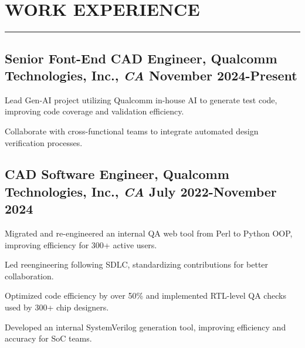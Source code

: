 \documentclass[11pt]{article}
\begin{document}
\vspace{0.1in}

\section*{\MakeUppercase{Work Experience}}
\hrule
\medskip
\subsection*{Senior Font-End CAD Engineer{\normalfont, Qualcomm Technologies, Inc.,
            \textit{CA} \hfill
            November 2024-Present}}
\begin{asparaitem}
    \item Lead Gen-AI project utilizing Qualcomm in-house AI to generate test code, improving code coverage and validation efficiency.
    \item Collaborate with cross-functional teams to integrate automated design verification processes.
\end{asparaitem}
\subsection*{CAD Software Engineer{\normalfont, Qualcomm Technologies, Inc.,
            \textit{CA} \hfill
            July 2022-November 2024}}
\begin{asparaitem}
    \item Migrated and re-engineered an internal QA web tool from Perl to Python OOP, improving efficiency for 300+ active users.
    \item Led reengineering following SDLC, standardizing contributions for better collaboration.
    \item Optimized code efficiency by over 50\% and implemented RTL-level QA checks used by 300+ chip designers.
    \item Developed an internal SystemVerilog generation tool, improving efficiency and accuracy for SoC teams.
\end{asparaitem}
\end{document}
